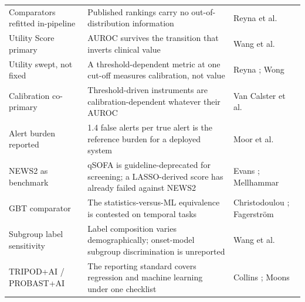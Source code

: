 {\begin{longtable}{p{3.1cm}p{5.6cm}p{4cm}}
        Comparators refitted in-pipeline & Published rankings carry no
        out-of-distribution information &
        Reyna et al.\ \cite{reyna2020utility} \\
        Utility Score primary & AUROC survives the transition that inverts
        clinical value &
        Wang et al.\ \cite{wang2025srpm} \\
        Utility swept, not fixed & A threshold-dependent metric at one cut-off
        measures calibration, not value &
        Reyna \cite{reyna2020utility};
        Wong \cite{wong2026epic} \\
        Calibration co-primary & Threshold-driven instruments are
        calibration-dependent whatever their AUROC &
        Van Calster et al.\ \cite{vancalster2019calibration} \\
        Alert burden reported & 1.4 false alerts per true alert is the
        reference burden for a deployed system &
        Moor et al.\ \cite{moor2023review} \\
        NEWS2 as benchmark & qSOFA is guideline-deprecated for screening; a
        LASSO-derived score has already failed against NEWS2 &
        Evans \cite{evans2021ssc};
        Mellhammar \cite{mellhammar2020news2} \\
        GBT comparator & The statistics-versus-ML equivalence is contested
        on temporal tasks &
        Christodoulou \cite{christodoulou2019cox};
        Fagerstr{\"o}m \cite{fagerstrom2019lisep} \\
        Subgroup label sensitivity & Label composition varies demographically;
        onset-model subgroup discrimination is unreported &
        Wang et al.\ \cite{wang2022equity} \\
        TRIPOD+AI / PROBAST+AI & The reporting standard covers regression and
        machine learning under one checklist &
        Collins \cite{collins2024tripodai};
        Moons \cite{moons2025probastai} \\
\end{longtable}
}
